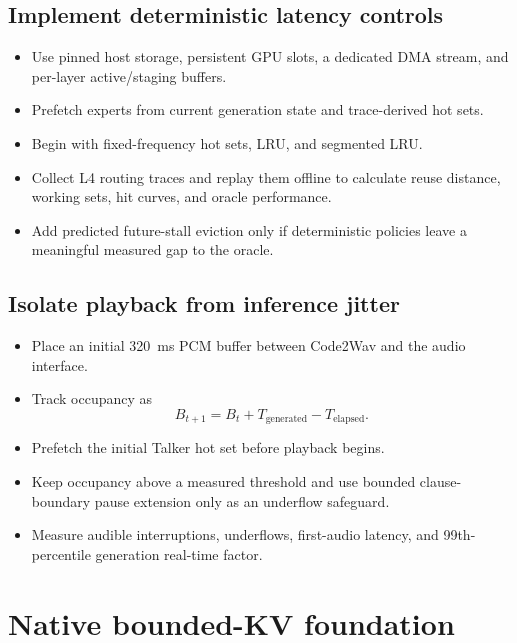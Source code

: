 \documentclass[10pt,letterpaper]{article}
\begin{document}
\subsection{Implement deterministic latency controls}
\begin{itemize}
    \item Use pinned host storage, persistent GPU slots, a dedicated DMA stream, and per-layer active/staging buffers.
    \item Prefetch experts from current generation state and trace-derived hot sets.
    \item Begin with fixed-frequency hot sets, LRU, and segmented LRU.
    \item Collect L4 routing traces and replay them offline to calculate reuse distance, working sets, hit curves, and oracle performance.
    \item Add predicted future-stall eviction only if deterministic policies leave a meaningful measured gap to the oracle.
\end{itemize}

\subsection{Isolate playback from inference jitter}
\begin{itemize}
    \item Place an initial 320~ms PCM buffer between Code2Wav and the audio interface.
    \item Track occupancy as
    \[
    B_{t+1}=B_t+T_{\mathrm{generated}}-T_{\mathrm{elapsed}}.
    \]
    \item Prefetch the initial Talker hot set before playback begins.
    \item Keep occupancy above a measured threshold and use bounded clause-boundary pause extension only as an underflow safeguard.
    \item Measure audible interruptions, underflows, first-audio latency, and 99th-percentile generation real-time factor.
\end{itemize}

\section{Native bounded-KV foundation}
\end{document}
